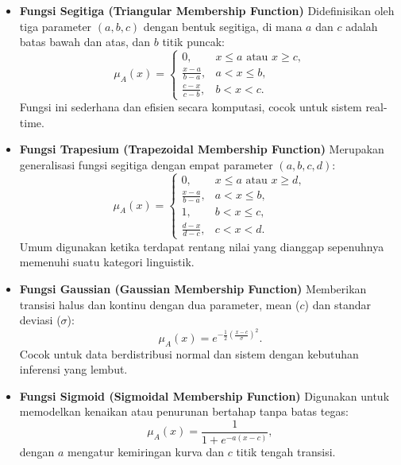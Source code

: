 \documentclass[12pt,a4paper]{article}
\theoremstyle{remark}
\begin{document}
\begin{itemize}
    \item \textbf{Fungsi Segitiga (Triangular Membership Function)}
          Didefinisikan oleh tiga parameter \((a,b,c)\) dengan bentuk segitiga, di mana \(a\) dan \(c\) adalah batas bawah dan atas, dan \(b\) titik puncak:
          \[
              \mu_A(x) =
              \begin{cases}
                  0,               & x \leq a \text{ atau } x \geq c, \\
                  \frac{x-a}{b-a}, & a < x \leq b,                    \\
                  \frac{c-x}{c-b}, & b < x < c.
              \end{cases}
          \]
          Fungsi ini sederhana dan efisien secara komputasi, cocok untuk sistem real-time.

    \item \textbf{Fungsi Trapesium (Trapezoidal Membership Function)}
          Merupakan generalisasi fungsi segitiga dengan empat parameter \((a,b,c,d)\):
          \[
              \mu_A(x) =
              \begin{cases}
                  0,               & x \leq a \text{ atau } x \geq d, \\
                  \frac{x-a}{b-a}, & a < x \leq b,                    \\
                  1,               & b < x \leq c,                    \\
                  \frac{d-x}{d-c}, & c < x < d.
              \end{cases}
          \]
          Umum digunakan ketika terdapat rentang nilai yang dianggap sepenuhnya memenuhi suatu kategori linguistik.

    \item \textbf{Fungsi Gaussian (Gaussian Membership Function)}
          Memberikan transisi halus dan kontinu dengan dua parameter, mean (\(c\)) dan standar deviasi (\(\sigma\)):
          \[
              \mu_A(x) = e^{-\frac{1}{2}\left(\frac{x - c}{\sigma}\right)^2}.
          \]
          Cocok untuk data berdistribusi normal dan sistem dengan kebutuhan inferensi yang lembut.

    \item \textbf{Fungsi Sigmoid (Sigmoidal Membership Function)}
          Digunakan untuk memodelkan kenaikan atau penurunan bertahap tanpa batas tegas:
          \[
              \mu_A(x) = \frac{1}{1 + e^{-a(x-c)}},
          \]
          dengan \(a\) mengatur kemiringan kurva dan \(c\) titik tengah transisi.
\end{itemize}
\end{document}
